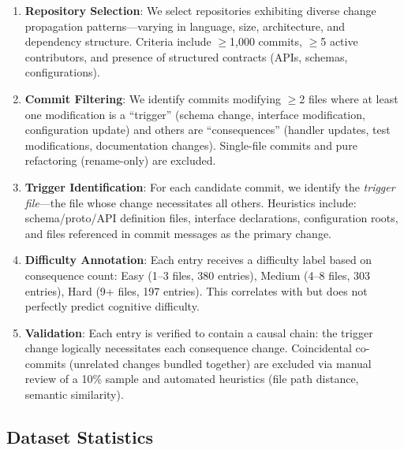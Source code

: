 \documentclass[sigconf,nonacm]{acmart}
\begin{document}
\begin{enumerate}
    \item \textbf{Repository Selection}: We select repositories exhibiting diverse change propagation patterns---varying in language, size, architecture, and dependency structure. Criteria include $\geq$1{,}000 commits, $\geq$5 active contributors, and presence of structured contracts (APIs, schemas, configurations).
    
    \item \textbf{Commit Filtering}: We identify commits modifying $\geq$2 files where at least one modification is a ``trigger'' (schema change, interface modification, configuration update) and others are ``consequences'' (handler updates, test modifications, documentation changes). Single-file commits and pure refactoring (rename-only) are excluded.
    
    \item \textbf{Trigger Identification}: For each candidate commit, we identify the \emph{trigger file}---the file whose change necessitates all others. Heuristics include: schema/proto/API definition files, interface declarations, configuration roots, and files referenced in commit messages as the primary change.
    
    \item \textbf{Difficulty Annotation}: Each entry receives a difficulty label based on consequence count: Easy (1--3 files, 380 entries), Medium (4--8 files, 303 entries), Hard (9+ files, 197 entries). This correlates with but does not perfectly predict cognitive difficulty.
    
    \item \textbf{Validation}: Each entry is verified to contain a causal chain: the trigger change logically necessitates each consequence change. Coincidental co-commits (unrelated changes bundled together) are excluded via manual review of a 10\% sample and automated heuristics (file path distance, semantic similarity).
\end{enumerate}

\subsection{Dataset Statistics}
\end{document}
